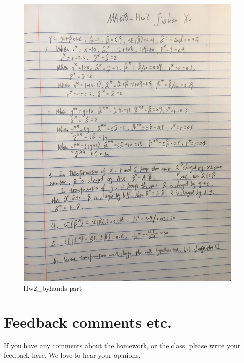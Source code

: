\documentclass[]{article}
\begin{document}
\begin{figure}
\centering
\includegraphics{hw2.jpg}
\caption{Hw2\_byhands part}
\end{figure}

\section{Feedback comments etc.}\label{feedback-comments-etc.}

If you have any comments about the homework, or the class, please write
your feedback here. We love to hear your opinions.
\end{document}
